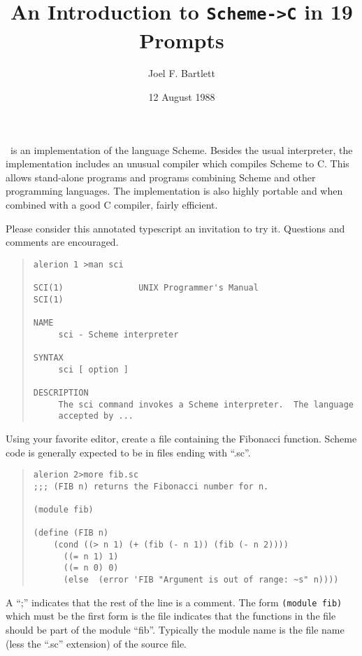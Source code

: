 \documentclass[11pt]{article}
\title{An Introduction to \texttt{Scheme->C} in 19 Prompts}
\author{Joel F. Bartlett}
\date{12 August 1988}
\begin{document}
\maketitle

\StoC\ is an implementation of the language Scheme.  Besides
the usual interpreter, the implementation includes an unusual
compiler which compiles Scheme to C.  This allows stand-alone
programs and programs combining Scheme and other programming
languages.  The implementation is also highly portable and when
combined with a good C compiler, fairly efficient.

Please consider this annotated typescript an invitation to try it.
Questions and comments are encouraged.

\begin{small}
\begin{quote}
\begin{verbatim}
alerion 1 >man sci

SCI(1)               UNIX Programmer's Manual                SCI(1)

NAME
     sci - Scheme interpreter

SYNTAX
     sci [ option ]

DESCRIPTION
     The sci command invokes a Scheme interpreter.  The language
     accepted by ...
\end{verbatim}
\end{quote}
\end{small}

Using your favorite editor, create a file containing the Fibonacci
function.  Scheme code is generally expected to be in files ending
with ``.sc''.

\begin{small}
\begin{quote}
\begin{verbatim}
alerion 2>more fib.sc
;;; (FIB n) returns the Fibonacci number for n.

(module fib)

(define (FIB n)
    (cond ((> n 1) (+ (fib (- n 1)) (fib (- n 2))))
	  ((= n 1) 1)
	  ((= n 0) 0)
	  (else  (error 'FIB "Argument is out of range: ~s" n))))
\end{verbatim}
\end{quote}
\end{small}

A ``;'' indicates that the rest of the line is a comment.  The form
\texttt{(module fib)} which must be the first form is the file indicates
that the functions in the file should be part of the module ``fib''.
Typically the module name is the file name (less the ``.sc'' extension)
of the source file.
\end{document}
